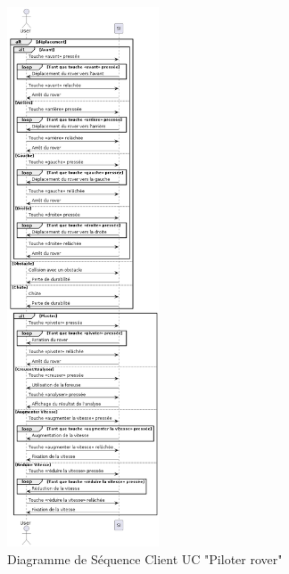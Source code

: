 \documentclass[12pt,a4paper]{scrartcl}
\begin{document}
\begin{figure}
    \centering
    \includegraphics[width=0.4\textwidth]{diag_seq_piloter_rover.png}
    \caption{Diagramme de Séquence Client UC "Piloter rover" }\label{seq2_client}
\end{figure}
\end{document}
